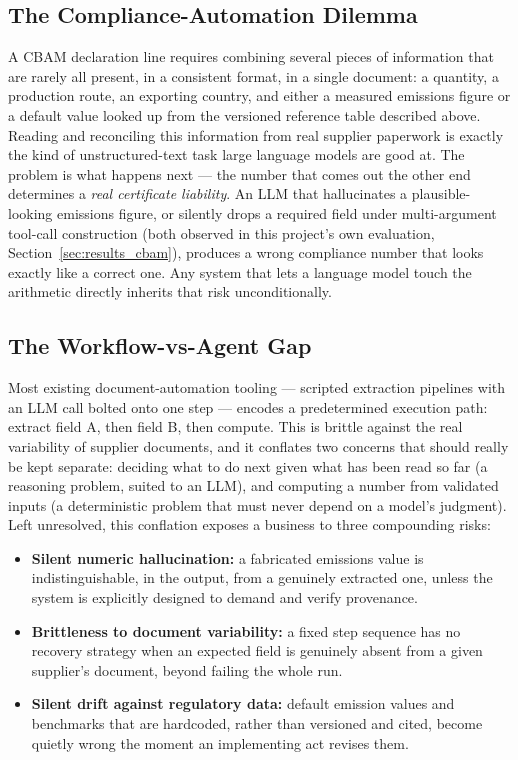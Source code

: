 \subsection*{The Compliance-Automation Dilemma}

A CBAM declaration line requires combining several pieces of information
that are rarely all present, in a consistent format, in a single
document: a quantity, a production route, an exporting country, and
either a measured emissions figure or a default value looked up from the
versioned reference table described above. Reading and reconciling this
information from real supplier paperwork is exactly the kind of
unstructured-text task large language models are good at. The problem is
what happens next --- the number that comes out the other end determines
a \textit{real certificate liability}. An LLM that hallucinates a
plausible-looking emissions figure, or silently drops a required field
under multi-argument tool-call construction (both observed in this
project's own evaluation, Section~\ref{sec:results_cbam}), produces a
wrong compliance number that looks exactly like a correct one. Any
system that lets a language model touch the arithmetic directly inherits
that risk unconditionally.

\subsection*{The Workflow-vs-Agent Gap}

Most existing document-automation tooling --- scripted extraction
pipelines with an LLM call bolted onto one step --- encodes a
predetermined execution path: extract field A, then field B, then
compute. This is brittle against the real variability of supplier
documents, and it conflates two concerns that should really be kept
separate: deciding what to do next given what has been read so far (a
reasoning problem, suited to an LLM), and computing a number from
validated inputs (a deterministic problem that must never depend on a
model's judgment). Left unresolved, this conflation exposes a business
to three compounding risks:

\begin{itemize}[label=\textbullet]
    \item \textbf{Silent numeric hallucination:} a fabricated emissions
    value is indistinguishable, in the output, from a genuinely extracted
    one, unless the system is explicitly designed to demand and verify
    provenance.

    \item \textbf{Brittleness to document variability:} a fixed step
    sequence has no recovery strategy when an expected field is genuinely
    absent from a given supplier's document, beyond failing the whole run.

    \item \textbf{Silent drift against regulatory data:} default emission
    values and benchmarks that are hardcoded, rather than versioned and
    cited, become quietly wrong the moment an implementing act revises
    them.
\end{itemize}

